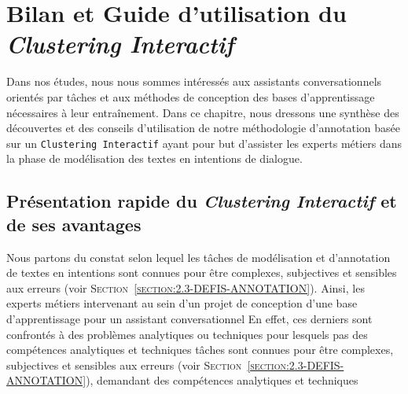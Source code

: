 \chapter{Bilan et Guide d'utilisation du \textit{Clustering Interactif}}
\label{chapter:5-GUIDE}
	
	Dans nos études, nous nous sommes intéressés aux assistants conversationnels orientés par tâches et aux méthodes de conception des bases d'apprentissage nécessaires à leur entraînement.
	Dans ce chapitre, nous dressons une synthèse des découvertes et des conseils d'utilisation de notre méthodologie d'annotation basée sur un \texttt{Clustering Interactif} ayant pour but d'assister les experts métiers dans la phase de modélisation des textes en intentions de dialogue.
	
	\section{Présentation rapide du \textit{Clustering Interactif} et de ses avantages}
		\label{section:5.1-GUIDE-PRESENTATION-RAPIDE}
		
		
		Nous partons du constat selon lequel les tâches de modélisation et d'annotation de textes en intentions sont connues pour être complexes, subjectives et sensibles aux erreurs (voir \textsc{Section~\ref{section:2.3-DEFIS-ANNOTATION}}).
		Ainsi, les experts métiers intervenant au sein d'un projet de conception d'une base d'apprentissage pour un assistant conversationnel 
		En effet, ces derniers sont confrontés à des problèmes analytiques ou techniques pour lesquels pas des compétences analytiques et techniques tâches sont connues pour être complexes, subjectives et sensibles aux erreurs (voir \textsc{Section~\ref{section:2.3-DEFIS-ANNOTATION}}), demandant des compétences analytiques et techniques 
		
